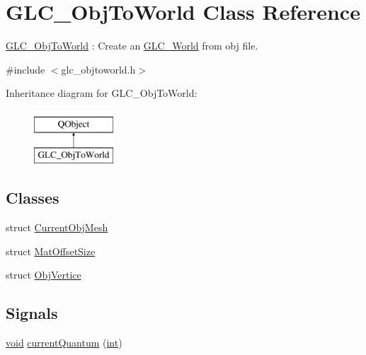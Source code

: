 \hypertarget{class_g_l_c___obj_to_world}{\section{G\-L\-C\-\_\-\-Obj\-To\-World Class Reference}
\label{class_g_l_c___obj_to_world}
}


\hyperlink{class_g_l_c___obj_to_world}{G\-L\-C\-\_\-\-Obj\-To\-World} \-: Create an \hyperlink{class_g_l_c___world}{G\-L\-C\-\_\-\-World} from obj file.  




{\ttfamily \#include $<$glc\-\_\-objtoworld.\-h$>$}

Inheritance diagram for G\-L\-C\-\_\-\-Obj\-To\-World\-:\begin{figure}[H]
\begin{center}
\leavevmode
\includegraphics[height=2.000000cm]{class_g_l_c___obj_to_world}
\end{center}
\end{figure}
\subsection*{Classes}
\begin{DoxyCompactItemize}
\item 
struct \hyperlink{struct_g_l_c___obj_to_world_1_1_current_obj_mesh}{Current\-Obj\-Mesh}
\item 
struct \hyperlink{struct_g_l_c___obj_to_world_1_1_mat_offset_size}{Mat\-Offset\-Size}
\item 
struct \hyperlink{struct_g_l_c___obj_to_world_1_1_obj_vertice}{Obj\-Vertice}
\end{DoxyCompactItemize}
\subsection*{Signals}
\begin{DoxyCompactItemize}
\item 
\hyperlink{group___u_a_v_objects_plugin_ga444cf2ff3f0ecbe028adce838d373f5c}{void} \hyperlink{class_g_l_c___obj_to_world_aa6b63fa708408fd417207d4e5268ddfd}{current\-Quantum} (\hyperlink{ioapi_8h_a787fa3cf048117ba7123753c1e74fcd6}{int})
\end{DoxyCompactItemize}

